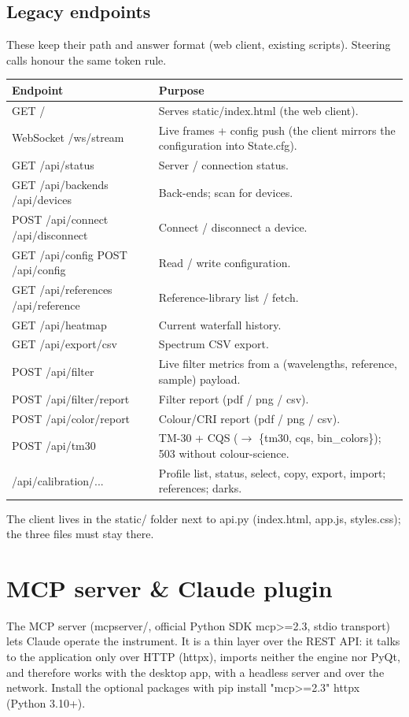\documentclass[12pt,a4paper]{article}
\DeclareRobustCommand{\code}[1]{{\ttfamily\small\def\_{\rawus\allowbreak}#1}}
\DeclareRobustCommand{\file}[1]{{\ttfamily\small\def\_{\rawus\allowbreak}#1}}
\begin{document}
\subsection{Legacy endpoints}
These keep their path and answer format (web client, existing scripts). Steering
calls honour the same token rule.
\begin{longtable}{@{}p{5.2cm}p{9.6cm}@{}}
\toprule \textbf{Endpoint} & \textbf{Purpose}\\ \midrule\endhead
\code{GET /} & Serves \code{static/index.html} (the web client).\\
\code{WebSocket /ws/stream} & Live frames + config push (the client mirrors the configuration into \code{State.cfg}).\\
\code{GET /api/status} & Server / connection status.\\
\code{GET /api/backends} \textbar{} \code{/api/devices} & Back-ends; scan for devices.\\
\code{POST /api/connect} \textbar{} \code{/api/disconnect} & Connect / disconnect a device.\\
\code{GET /api/config} \textbar{} \code{POST /api/config} & Read / write configuration.\\
\code{GET /api/references} \textbar{} \code{/api/reference} & Reference-library list / fetch.\\
\code{GET /api/heatmap} & Current waterfall history.\\
\code{GET /api/export/csv} & Spectrum CSV export.\\
\code{POST /api/filter} & Live filter metrics from a (wavelengths, reference, sample) payload.\\
\code{POST /api/filter/report} & Filter report (pdf / png / csv).\\
\code{POST /api/color/report} & Colour/CRI report (pdf / png / csv).\\
\code{POST /api/tm30} & TM-30 + CQS ($\to$ \{tm30, cqs, bin\_colors\}); 503 without colour-science.\\
\code{/api/calibration/...} & Profile list, status, select, copy, export, import; references; darks.\\
\bottomrule
\end{longtable}

\noindent The client lives in the \code{static/} folder next to \file{api.py}
(\file{index.html}, \file{app.js}, \file{styles.css}); the three files must stay there.

\section{MCP server \& Claude plugin}\label{sec:mcp}
The MCP server (\file{mcp\_server/}, official Python SDK \code{mcp>=2.3}, stdio
transport) lets Claude operate the instrument. It is a thin layer over the REST API:
it talks to the application only over HTTP (\code{httpx}), imports neither the engine
nor PyQt, and therefore works with the desktop app, with a headless server and over
the network. Install the optional packages with
\code{pip install "mcp>=2.3" httpx} (Python 3.10+).
\end{document}
